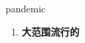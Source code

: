 
\begin{frame}
{\huge pandemic}
\begin{center}
\begin{enumerate}\Large
  \item \textbf{大范围流行的}
\end{enumerate}
\end{center}
\end{frame}
